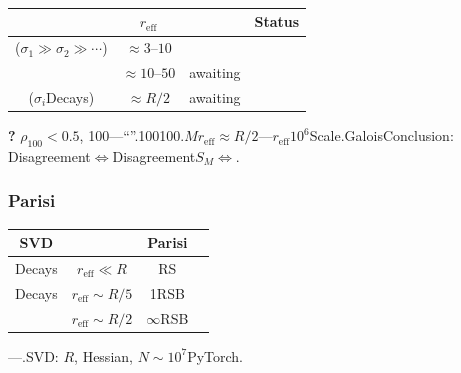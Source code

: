 \documentclass[12pt,a4paper]{article}
\theoremstyle{remark}
\begin{document}
\subsubsection{}
\begin{center}
\begin{tabular}{c|c|c|c}
\toprule
\textbf{} & \textbf{$r_{\text{eff}}$} & \textbf{} & \textbf{Status} \\
\midrule
($\sigma_1 \gg \sigma_2 \gg \cdots$) & $\approx 3\text{--}10$ &  & \textbf{} \\
 & $\approx 10\text{--}50$ & awaiting & \textbf{} \\
($\sigma_i$Decays) & $\approx R/2$ & awaiting & \textbf{} \\
\bottomrule
\end{tabular}
\end{center}
\textbf{?} $\rho_{100} < 0.5$, 100---``''.100100.$M$$r_{\text{eff}} \approx R/2$---$r_{\text{eff}}$$10^6$Scale.GaloisConclusion: Disagreement$\Longleftrightarrow$Disagreement$S_M$$\Longleftrightarrow$.
\subsubsection{Parisi}
\begin{center}
\begin{tabular}{c|c|c|c}
\toprule
\textbf{SVD} & \textbf{} & \textbf{Parisi} & \textbf{} \\
\midrule
Decays & $r_{\text{eff}} \ll R$ & RS &  \\
Decays & $r_{\text{eff}} \sim R/5$ & 1RSB &  \\
 & $r_{\text{eff}} \sim R/2$ & $\infty$RSB &  \\
\bottomrule
\end{tabular}
\end{center}
---.SVD: $R$, Hessian, $N \sim 10^7$PyTorch.
\end{document}
